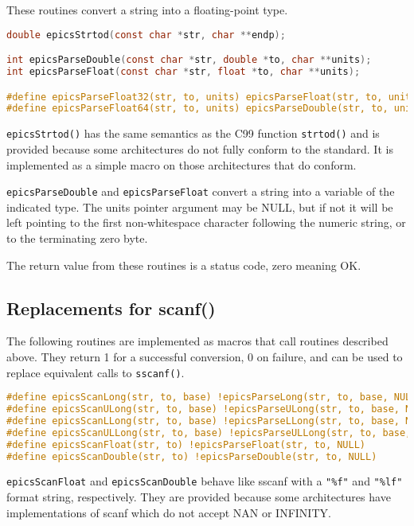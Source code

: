 These routines convert a string into a floating-point type.

\begin{lstlisting}[language=C]
double epicsStrtod(const char *str, char **endp);

int epicsParseDouble(const char *str, double *to, char **units);
int epicsParseFloat(const char *str, float *to, char **units);

#define epicsParseFloat32(str, to, units) epicsParseFloat(str, to, units)
#define epicsParseFloat64(str, to, units) epicsParseDouble(str, to, units)
\end{lstlisting}

\verb|epicsStrtod()| has the same semantics as the C99 function \verb|strtod()| and is provided because some architectures do not fully conform to the standard. It is implemented as a simple macro on those architectures that do conform.

\verb|epicsParseDouble| and \verb|epicsParseFloat| convert a string into a variable of the indicated type.
The units pointer argument may be NULL, but if not it will be left pointing to the first non-whitespace character following the numeric string, or to the terminating zero byte.

The return value from these routines is a status code, zero meaning OK.

\subsection{Replacements for scanf()}

The following routines are implemented as macros that call routines described above.
They return 1 for a successful conversion, 0 on failure, and can be used to replace equivalent calls to \verb|sscanf()|.

\begin{lstlisting}[language=C]
#define epicsScanLong(str, to, base) !epicsParseLong(str, to, base, NULL)
#define epicsScanULong(str, to, base) !epicsParseULong(str, to, base, NULL)
#define epicsScanLLong(str, to, base) !epicsParseLLong(str, to, base, NULL)
#define epicsScanULLong(str, to, base) !epicsParseULLong(str, to, base, NULL)
#define epicsScanFloat(str, to) !epicsParseFloat(str, to, NULL)
#define epicsScanDouble(str, to) !epicsParseDouble(str, to, NULL)
\end{lstlisting}


\verb|epicsScanFloat| and \verb|epicsScanDouble| behave like sscanf with a \verb|"%f"| and \verb|"%lf"| format string, respectively.
They are provided because some architectures have implementations of scanf which do not accept NAN or INFINITY.

